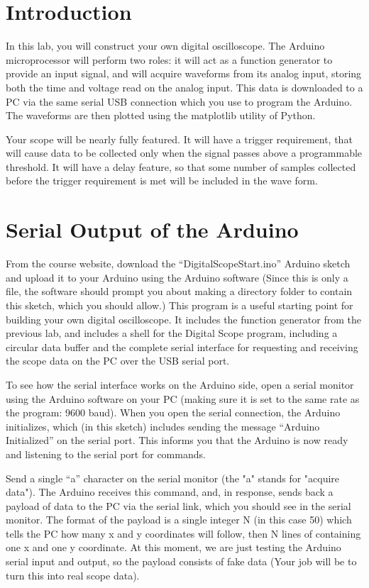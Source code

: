 \documentclass[12pt]{article}
\begin{document}
\section{Introduction}

In this lab, you will construct your own digital oscilloscope.  The Arduino microprocessor will perform two roles: it will act as a function generator to provide an input signal, and will acquire waveforms from its analog input, storing both the time and voltage read on the analog input.  This data is downloaded to a PC via the same serial USB connection which you use to program the Arduino.  The waveforms are then plotted using the matplotlib utility of Python.

Your scope will be nearly fully featured.  It will have a trigger requirement, that will cause data to be collected only when the signal passes above a programmable threshold.  It will have a delay feature, so that some number of samples collected before the trigger requirement is met will be included in the wave form.

\section{Serial Output of the Arduino}

\noindent
From the course website, download the ``DigitalScopeStart.ino'' Arduino sketch and upload it to your Arduino using the Arduino software (Since this is only a file, the software should prompt you about making a directory folder to contain this sketch, which you should allow.)  This program is a useful starting point for building your own digital oscilloscope.  It includes the function generator from the previous lab, and includes a shell for the Digital Scope program, including a circular data buffer and the complete serial interface for requesting and receiving the scope data on the PC over the USB serial port.

To see how the serial interface works on the Arduino side, open a serial monitor using the Arduino software on your PC (making sure it is set to the same
rate as the program: 9600 baud).  When you open the serial connection, the Arduino initializes, which (in this sketch) includes sending the message ``Arduino Initialized'' on the serial port.  This informs you that the Arduino is now ready and listening to the serial port for commands.

Send a single ``a'' character on the serial monitor (the "a" stands for "acquire data").  The Arduino receives this command, and,
in response, sends back a payload of data to the PC via the serial link, which you should see in the serial monitor.  The format of the payload is a single integer N (in this case 50) which tells the PC how many x and y coordinates will follow, then N lines of containing one x and one y coordinate.  At this moment, we
are just testing the Arduino serial input and output, so the payload consists of fake data (Your job will be to turn this into real scope data).
\end{document}
